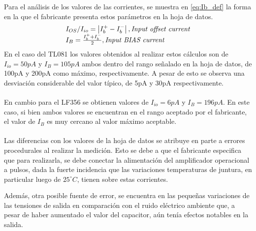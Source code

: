 \noindent Para el an\'alisis de los valores de las corrientes, se muestra  en \ref{eq:Ib_def} la forma en la que el fabricante presenta estos par\'ametros en la hoja de datos. 
\begin{equation}
    \centering
    \left.
    \begin{array}{ll}
        I_{OS} /I_{io} = \left| I_b^+ - I_b^- \right|, \textit{Input offset current} \\
        I_B = \frac{I_b^+ + I_b^- }{2}, \textit{Input BIAS current}
    \end{array}
    \right.
  \label{eq:Ib_def}
\end{equation}
En el caso del TL081 los valores obtenidos al realizar estos c\'alculos son de $I_{io} =50pA $ y $I_B = 105pA$ ambos dentro del rango se\~nalado en la hoja de datos, de 100pA y 200pA como m\'aximo, respectivamente. A pesar de esto se observa una desviaci\'on considerable del valor t\'ipico, de 5pA y 30pA respectivamente.
\\\\
En cambio para el LF356 se obtienen valores de $I_{io} =6pA $ y $I_B = 196pA$. En este caso, si bien ambos valores se encuentran en el rango aceptado por el fabricante, el valor de $I_B$ es muy cercano al valor m\'aximo aceptable.
\\\\
Las diferencias con los valores de la hoja de datos se atribuye en parte  a errores procedurales al realizar la medici\'on. Esto se debe a que el fabricante especifica que para realizarla, se debe conectar la alimentaci\'on del amplificador operacional a pulsos, dada la fuerte incidencia que las variaciones temperaturas de juntura, en particular luego de $25^\circ C$, tienen sobre estas corrientes.

Adem\'as, otra posible fuente de error, se encuentra en las peque\~nas variaciones de las tensiones de salida en comparaci\'on con el ruido el\'ectrico ambiente que, a pesar de haber aumentado el valor del capacitor, a\'un ten\'ia efectos notables en la salida.


